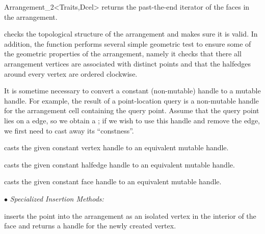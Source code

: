 \begin{ccRefClass}{Arrangement_2<Traits,Dcel>}
    {returns the past-the-end iterator of the faces in the arrangement.}
    

   {checks the topological structure of the arrangement and makes sure it is
    valid. In addition, the function performs several simple geometric test
    to ensure some of the geometric properties of the arrangement, namely it
    checks that there all arrangement vertices are associated with distinct
    points and that the halfedges around every vertex are ordered clockwise.}

\begin{ccAdvanced}


It is sometime necessary to convert a constant (non-mutable) handle to
a mutable handle. For example, the result of a point-location query is
a non-mutable handle for the arrangement cell containing the query point.
Assume that the query point lies on a edge, so we obtain a
; if we wish to use this handle and remove the
edge, we first need to cast away its ``constness''.
 
    {casts the given constant vertex handle to an equivalent mutable handle.}

    {casts the given constant halfedge handle to an equivalent mutable handle.}

    {casts the given constant face handle to an equivalent mutable handle.}

\end{ccAdvanced}

\ccModifiers

$\bullet$ {\sl Specialized Insertion Methods:}

   {inserts the point  into the arrangement as an isolated vertex in
    the interior of the face  and returns a handle for the newly
    created vertex.
    }


\end{ccRefClass}
